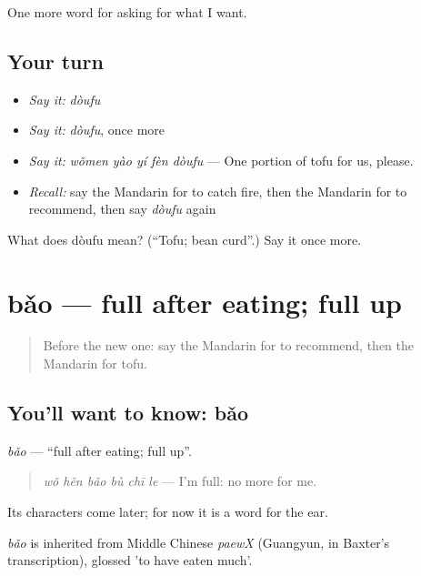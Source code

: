 \begin{grammarlens}[title={What you've built}]
One more word for asking for what I want.
\end{grammarlens}

\subsection*{Your turn}
\begin{itemize}
\raggedright
  \item \emph{Say it:} \emph{dòufu}
  \item \emph{Say it:} \emph{dòufu}, once more
  \item \emph{Say it:} \emph{wǒmen yào yí fèn dòufu} — One portion of tofu for us, please.
  \item \emph{Recall:} say the Mandarin for to catch fire, then the Mandarin for to recommend, then say \emph{dòufu} again
\end{itemize}

\begin{tcolorbox}[breakable,colback=teal!4,colframe=teal!35!black,title={Before you move on}]
What does dòufu mean? (\textquotedblleft{}Tofu; bean curd\textquotedblright{}.) Say it once more.
\end{tcolorbox}
\section[bǎo]{bǎo — full after eating; full up}

\label{lesson:ZH-C177-bao}



\begin{quote}
Before the new one: say the Mandarin for to recommend, then the Mandarin for tofu.
\end{quote}

\subsection*{You'll want to know: bǎo}
\emph{bǎo} — \textquotedblleft{}full after eating; full up\textquotedblright{}.

\begin{quote}
\emph{wǒ hěn bǎo bù chī le} — I'm full: no more for me.
\end{quote}

Its characters come later; for now it is a word for the ear.

\begin{cousinweb}
\emph{bǎo} is inherited from Middle Chinese \emph{paewX} (Guangyun, in Baxter's transcription), glossed 'to have eaten much'.
\end{cousinweb}

